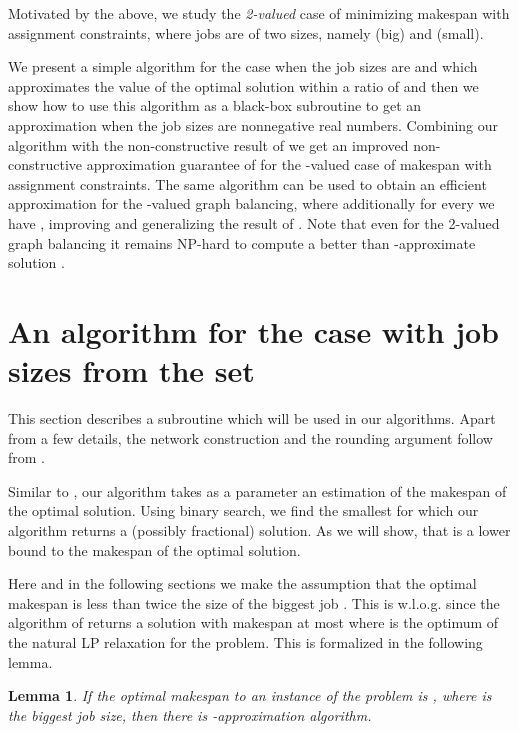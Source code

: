 \documentclass[11pt]{article}\usepackage{amsmath}
\newtheorem{lemma}{Lemma}[section]
\newenvironment{proof}{\noindent{\bf Proof.}}{  \rule{2mm}{3mm}}
\begin{document}
Motivated by the above, 
we study the {\em 2-valued} case of minimizing makespan 
with assignment
constraints, where     jobs are of two sizes,  namely  (big) and
 (small). 
\iffalse ========================================
As mentioned,  the
approximation hardness of the problem is still  unless 
(\cite{lenstra},\cite{ebenlendr})  and  the  integrality  gap  of  the
natural LP of
\cite{lenstra}  is  still  \cite{ebenlendr}.  
=================================== \fi
We 
present a  simple  algorithm for the case when the job sizes are
 and  which approximates the value of the
optimal solution  within a ratio  of  and then  we show
how to use this algorithm as  a black-box subroutine to get an approximation when
the job  sizes are nonnegative  real numbers. Combining  our algorithm
with the non-constructive result of \cite{svensson} we get an improved
non-constructive approximation guarantee  of  for the -valued
case of  makespan with assignment constraints. The  same algorithm can
be used to obtain an efficient  approximation for the -valued
graph balancing, where additionally for every  we have , 
improving and generalizing the result of
\cite{asa}. Note  that even
for the 
2-valued graph
balancing 
it remains {\sf NP}-hard to compute a better than -approximate
solution 
\cite{asa, ebenlendr}.


\section{An algorithm for the case with job sizes from the set  }

This section describes a subroutine which will be used in our
algorithms. 
Apart from a few details, the network construction and the rounding
argument follow from \cite{Kleinberg96a}. 

Similar to \cite{lenstra}, our algorithm takes as a parameter an estimation  of the makespan of the optimal solution. Using binary search, we find the smallest  for which our algorithm returns a (possibly fractional) solution. As we will show, that  is a lower bound to the makespan of the optimal solution.

Here and in the following sections we make the assumption that the optimal makespan is less than twice the size of the biggest job . This is w.l.o.g. since the algorithm 
of \cite{lenstra} returns a solution with makespan at most 
where   is the optimum of the natural LP relaxation for the
problem.  This is formalized in the following lemma. 

\begin{lemma} \cite{lenstra} \label{lemma:add}
If the optimal makespan to an instance of the problem is , where  is the biggest job size, then there is -approximation algorithm. 
\end{lemma}
\iffalse =========================
\begin{proof}
The rounding algorithm of \cite{lenstra} returns a solution with makespan at most . This is clearly a  approximate solution.
\end{proof}
====================== \fi 
\end{document}
